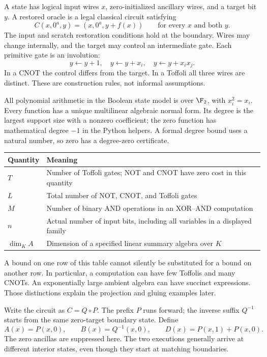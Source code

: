 A state has logical input wires $x$, zero-initialized ancillary wires, and a
target bit $y$. A restored oracle is a legal classical circuit satisfying
\[
 C(x,0^a,y)=(x,0^a,y+f(x))
 \qquad\text{for every }x\text{ and both }y.
\]
The input and scratch restoration conditions hold at the boundary. Wires may
change internally, and the target may control an intermediate gate. Each
primitive gate is an involution:
\[
 y\leftarrow y+1,\quad y\leftarrow y+x_i,\quad
 y\leftarrow y+x_i x_j.
\]
In a CNOT the control differs from the target. In a Toffoli all three wires
are distinct. These are construction rules, not informal assumptions.

All polynomial arithmetic in the Boolean state model is over $\F_2$, with
$x_i^2=x_i$. Every function has a unique multilinear algebraic normal form.
Its degree is the largest support size with a nonzero coefficient; the zero
function has mathematical degree $-1$ in the Python helpers. A formal degree
bound uses a natural number, so zero has a degree-zero certificate.

\begin{tabularx}{\textwidth}{@{}p{1.15in}X@{}}\toprule
Quantity & Meaning\\\midrule
$T$ & Number of Toffoli gates; NOT and CNOT have zero cost in this quantity\\
$L$ & Total number of NOT, CNOT, and Toffoli gates\\
$M$ & Number of binary AND operations in an XOR--AND computation\\
$n$ & Actual number of input bits, including all variables in a displayed family\\
$\dim_K A$ & Dimension of a specified linear summary algebra over $K$\\\bottomrule
\end{tabularx}

A bound on one row of this table cannot silently be substituted for a bound
on another row. In particular, a computation can have few Toffolis and many
CNOTs. An exponentially large ambient algebra can have succinct expressions.
Those distinctions explain the projection and gluing examples later.


Write the circuit as $C=Q\circ P$. The prefix $P$ runs forward; the inverse
suffix $Q^{-1}$ starts from the same zero-target boundary state. Define
\[
 A(x)=P(x,0),\qquad B(x)=Q^{-1}(x,0),\qquad
 D(x)=P(x,1)+P(x,0).
\]
The zero ancillas are suppressed here. The two executions generally arrive
at different interior states, even though they start at matching boundaries.

